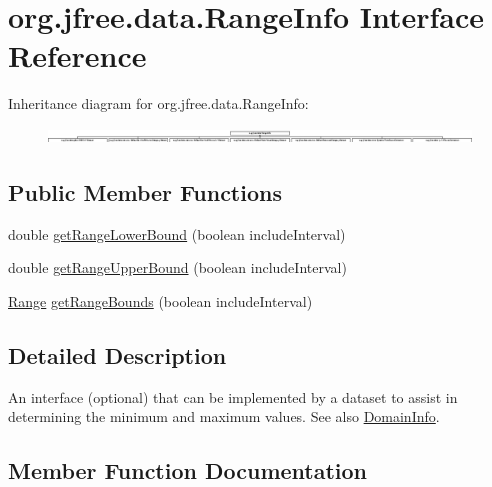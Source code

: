 \hypertarget{interfaceorg_1_1jfree_1_1data_1_1_range_info}{}\section{org.\+jfree.\+data.\+Range\+Info Interface Reference}
\label{interfaceorg_1_1jfree_1_1data_1_1_range_info}
Inheritance diagram for org.\+jfree.\+data.\+Range\+Info\+:\begin{figure}[H]
\begin{center}
\leavevmode
\includegraphics[height=0.426667cm]{interfaceorg_1_1jfree_1_1data_1_1_range_info}
\end{center}
\end{figure}
\subsection*{Public Member Functions}
\begin{DoxyCompactItemize}
\item 
double \mbox{\hyperlink{interfaceorg_1_1jfree_1_1data_1_1_range_info_ab0187015bbe75ca00a62a71de72c1a1d}{get\+Range\+Lower\+Bound}} (boolean include\+Interval)
\item 
double \mbox{\hyperlink{interfaceorg_1_1jfree_1_1data_1_1_range_info_a85987bb398c50351d190b2b888ff3348}{get\+Range\+Upper\+Bound}} (boolean include\+Interval)
\item 
\mbox{\hyperlink{classorg_1_1jfree_1_1data_1_1_range}{Range}} \mbox{\hyperlink{interfaceorg_1_1jfree_1_1data_1_1_range_info_a2752094d868839b5565131a5bdd8e75e}{get\+Range\+Bounds}} (boolean include\+Interval)
\end{DoxyCompactItemize}


\subsection{Detailed Description}
An interface (optional) that can be implemented by a dataset to assist in determining the minimum and maximum values. See also \mbox{\hyperlink{interfaceorg_1_1jfree_1_1data_1_1_domain_info}{Domain\+Info}}. 

\subsection{Member Function Documentation}
\mbox{\label{interfaceorg_1_1jfree_1_1data_1_1_range_info_a2752094d868839b5565131a5bdd8e75e}} 
